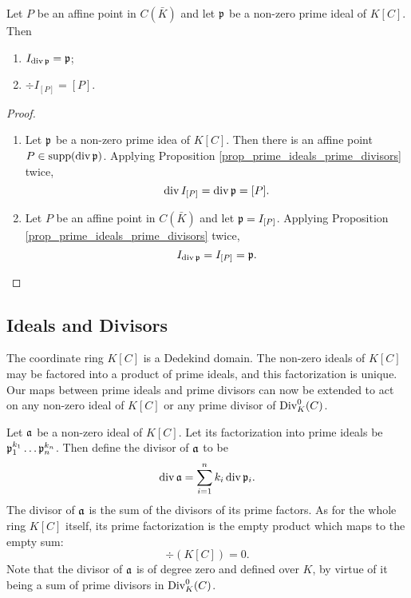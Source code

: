 \begin{proposition}
  Let $P$ be an affine point in $C(\bar K)$ and let $\frak p$ be a non-zero prime ideal of $K[C]$. Then
  \begin{enumerate}[label=(\roman*)]
    \item $I_{\div \frak p} = \frak p$;
    \item $\div I_{[P]} = [P]$.
  \end{enumerate}
\end{proposition}
\begin{proof}
  \begin{enumerate}[label=(\roman*)]
    \item
      Let $\frak p$ be a non-zero prime idea of $K[C]$.
      Then there is an affine point $P \in \supp(\div \frak p)$.
      Applying Proposition \ref{prop_prime_ideals_prime_divisors} twice,
      \[ \div I_{[P]} = \div \frak p = [P]. \]
    
    \item
      Let $P$ be an affine point in $C(\bar K)$ and let $\frak p = I_{[P]}$.
      Applying Proposition \ref{prop_prime_ideals_prime_divisors} twice,
      \[ I_{\div \frak p} = I_{[P]} = \frak p. \]
  \end{enumerate}
\end{proof}




\subsection{Ideals and Divisors}

The coordinate ring $K[C]$ is a Dedekind domain.
The non-zero ideals of $K[C]$ may be factored into a product of prime ideals, and this factorization is unique.
Our maps between prime ideals and prime divisors can now be extended to act on any non-zero ideal of $K[C]$ or any prime divisor of $\Div_K^0(C)$.

Let $\frak a$ be a non-zero ideal of $K[C]$.
Let its factorization into prime ideals be $\frak p_1^{k_1} \dots \frak p_n^{k_n}$.
Then define the divisor of $\frak a$ to be
\[ \div \frak a = \sum_{i=1}^n k_i \div \frak p_i. \]
The divisor of $\frak a$ is the sum of the divisors of its prime factors.
As for the whole ring $K[C]$ itself,
its prime factorization is the empty product which maps to the empty sum:
  \[ \div (K[C]) = 0. \]
Note that the divisor of $\frak a$ is of degree zero and defined over $K$,
by virtue of it being a sum of prime divisors in $\Div_K^0(C)$.

